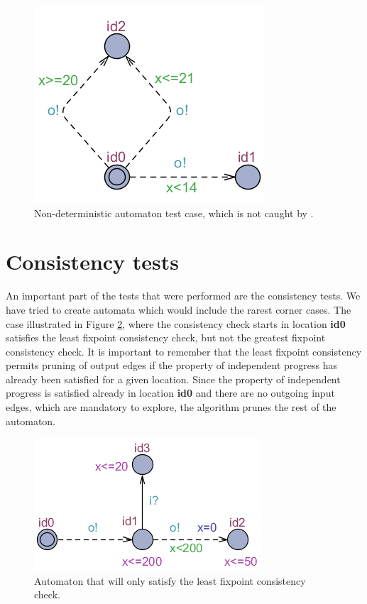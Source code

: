 \begin{figure}
    \centering
    \includegraphics[scale = 0.7]{figures/determ.png}
    \caption{Non-deterministic automaton test case, which is not caught by .}
    \label{fig:K7}
\end{figure}

\section{Consistency tests} \label{sec:consistTests}
An important part of the tests that were performed are the consistency tests. We have tried to create automata which would include the rarest corner cases. The case illustrated in Figure \ref{fig:G17}, where the consistency check starts in location \textbf{id0} satisfies the least fixpoint consistency check, but not the greatest fixpoint consistency check. It is important to remember that the least fixpoint consistency permits pruning of output edges if the property of independent progress has already been satisfied for a given location. Since the property of independent progress is satisfied already in location \textbf{id0} and there are no outgoing input edges, which are mandatory to explore, the algorithm prunes the rest of the automaton.

\begin{figure}
    \centering
    \includegraphics[scale = 0.8]{figures/test-aut-leastCons.png}
    \caption{Automaton that will only satisfy the least fixpoint consistency check.}
    \label{fig:G17}
\end{figure}

